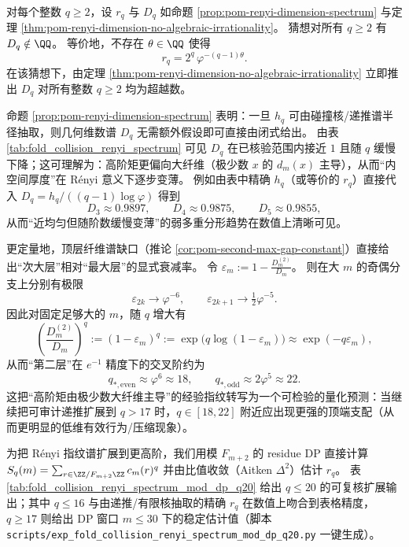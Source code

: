\begin{conjecture}\label{conj:pom-renyi-dimension-universal-transcendence}
对每个整数 \(q\ge 2\)，设 \(r_q\) 与 \(D_q\) 如命题 \ref{prop:pom-renyi-dimension-spectrum} 与定理 \ref{thm:pom-renyi-dimension-no-algebraic-irrationality}。
猜想对所有 \(q\ge 2\) 有 \(D_q\notin\QQ\)。
等价地，不存在 \(\theta\in\QQ\) 使得
\[
r_q=2^q\,\varphi^{-(q-1)\theta}.
\]
在该猜想下，由定理 \ref{thm:pom-renyi-dimension-no-algebraic-irrationality} 立即推出 \(D_q\) 对所有整数 \(q\ge 2\) 均为超越数。
\end{conjecture}

\begin{remark}\label{rem:pom-renyi-dimension-values}
命题 \ref{prop:pom-renyi-dimension-spectrum} 表明：一旦 \(h_q\) 可由碰撞核/递推谱半径抽取，则几何维数谱 \(D_q\) 无需额外假设即可直接由闭式给出。
由表 \ref{tab:fold_collision_renyi_spectrum} 可见 \(D_q\) 在已核验范围内接近 \(1\) 且随 \(q\) 缓慢下降；这可理解为：高阶矩更偏向大纤维（极少数 \(x\) 的 \(d_m(x)\) 主导），从而“内空间厚度”在 Rényi 意义下逐步变薄。
例如由表中精确 \(h_q\)（或等价的 \(r_q\)）直接代入
\(
D_q=h_q/((q-1)\log\varphi)
\)
得到
\[
D_3\approx 0.9897,\qquad D_4\approx 0.9875,\qquad D_5\approx 0.9855,
\]
从而“近均匀但随阶数缓慢变薄”的弱多重分形趋势在数值上清晰可见。
\par
更定量地，顶层纤维谱缺口（推论 \ref{cor:pom-second-max-gap-constant}）直接给出“次大层”相对“最大层”的显式衰减率。
令
\(
\varepsilon_m:=1-\frac{D_m^{(2)}}{D_m}
\)。
则在大 \(m\) 的奇偶分支上分别有极限
\[
\varepsilon_{2k}\to \varphi^{-6},
\qquad
\varepsilon_{2k+1}\to \tfrac12\varphi^{-5}.
\]
因此对固定足够大的 \(m\)，随 \(q\) 增大有
\[
\left(\frac{D_m^{(2)}}{D_m}\right)^q
:=(1-\varepsilon_m)^q
:=\exp\!\bigl(q\log(1-\varepsilon_m)\bigr)
\approx \exp(-q\varepsilon_m),
\]
从而“第二层”在 \(e^{-1}\) 精度下的交叉阶约为
\[
q_{\ast,\mathrm{even}}\approx \varphi^{6}\approx 18,
\qquad
q_{\ast,\mathrm{odd}}\approx 2\varphi^{5}\approx 22.
\]
这把“高阶矩由极少数大纤维主导”的经验指纹转写为一个可检验的量化预测：当继续把可审计递推扩展到 \(q>17\) 时，\(q\in[18,22]\) 附近应出现更强的顶端支配（从而更明显的低维有效行为/压缩现象）。
\end{remark}



\begin{remark}[扩展指纹（可复核）：\texorpdfstring{$q\le 20$}{q<=20} 的 \texorpdfstring{$r_q$}{rq} 与 \texorpdfstring{$h_q$}{hq}]\label{rem:pom-renyi-spectrum-q20}
为把 Rényi 指纹谱扩展到更高阶，我们用模 \(F_{m+2}\) 的 residue DP 直接计算
\(
S_q(m)=\sum_{r\in\ZZ/F_{m+2}\ZZ}c_m(r)^q
\)
并由比值收敛（Aitken \(\Delta^2\)）估计 \(r_q\)。
表 \ref{tab:fold_collision_renyi_spectrum_mod_dp_q20} 给出 \(q\le 20\) 的可复核扩展输出；其中 \(q\le 16\) 与由递推/有限核抽取的精确 \(r_q\) 在数值上吻合到表格精度，\(q\ge 17\) 则给出 DP 窗口 \(m\le 30\) 下的稳定估计值（脚本 \texttt{scripts/exp\_fold\_collision\_renyi\_spectrum\_mod\_dp\_q20.py} 一键生成）。
\end{remark}

